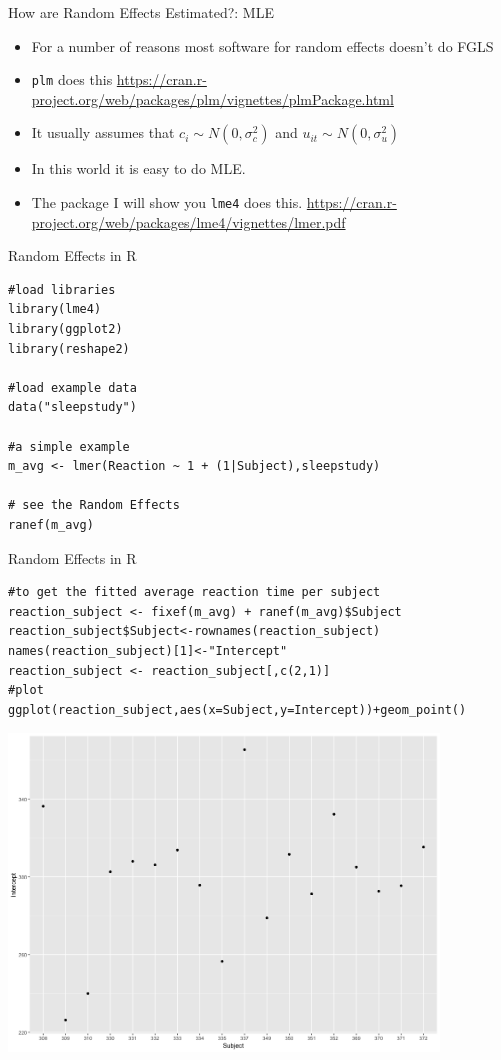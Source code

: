 \begin{frame}{How are Random Effects Estimated?: MLE}
\begin{itemize}
\item For a number of reasons most software for random effects doesn't do FGLS
\item \texttt{plm} does this \url{https://cran.r-project.org/web/packages/plm/vignettes/plmPackage.html}
\item It usually assumes that $c_i \sim N(0,\sigma_c^2)$ and $u_{it} \sim N(0,\sigma_u^2)$
\item In this world it is easy to do MLE.
\item The package I will show you \texttt{lme4} does this. \url{https://cran.r-project.org/web/packages/lme4/vignettes/lmer.pdf}
\end{itemize}
\end{frame}


\begin{frame}[fragile]{Random Effects in R}
\begin{verbatim}
#load libraries
library(lme4)
library(ggplot2)
library(reshape2)

#load example data
data("sleepstudy")

#a simple example
m_avg <- lmer(Reaction ~ 1 + (1|Subject),sleepstudy) 

# see the Random Effects
ranef(m_avg)
\end{verbatim}
\end{frame}

\begin{frame}[fragile]{Random Effects in R}
\begin{verbatim}
#to get the fitted average reaction time per subject
reaction_subject <- fixef(m_avg) + ranef(m_avg)$Subject
reaction_subject$Subject<-rownames(reaction_subject)
names(reaction_subject)[1]<-"Intercept"
reaction_subject <- reaction_subject[,c(2,1)]
#plot
ggplot(reaction_subject,aes(x=Subject,y=Intercept))+geom_point()
\end{verbatim}
\end{frame}


\begin{frame}%
\begin{center}
\includegraphics[width=4.5in]{./resources/random_intercepts.png}
\end{center}
\end{frame}

